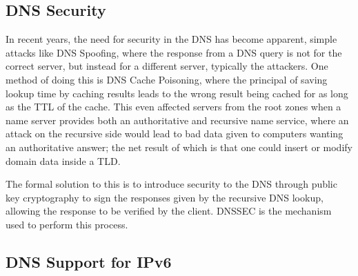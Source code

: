 \documentclass[11pt, a4paper]{article}
\begin{document}



\subsection{DNS Security}
\label{subsec:dnssec}
In recent years, the need for security in the \gls{DNS} has become apparent, 
simple attacks like \gls{DNS} Spoofing, where the response from a \gls{DNS}
query is not for the correct server, but instead for a different server, 
typically the attackers. One method of doing this is \gls{DNS} Cache 
Poisoning\cite{davies2008cache}, where the principal of saving lookup time by
caching results leads to the wrong result being cached for as long as the 
\gls{TTL} of the cache. This even affected servers from the root zones when a
name server provides both an authoritative and recursive name service, where an
attack on the recursive side would lead to bad data given to computers wanting 
an authoritative answer; the net result of which is that one could insert or
modify domain data inside a \gls{TLD}. %

The formal solution to this is to introduce security to the \gls{DNS} through
public key cryptography to sign the responses given by the recursive \gls{DNS}
lookup, allowing the response to be verified by the client. \Gls{DNSSEC} is the
mechanism used to perform this process.

\subsection{DNS Support for IPv6}
\label{subsec:dnsipv6}






\newpage


\end{document}
